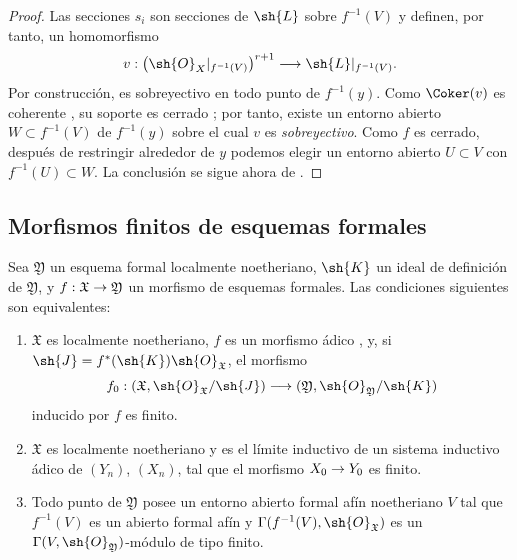 \documentclass[oneside]{amsart}
\makeatletter
\newcommand{\ega@arrow}[2]{\mathchoice{#1}{#2}{#2}{#2}}
\renewcommand{\to}{\ega@arrow{\longrightarrow}{\rightarrow}}
\let\EGAOriginalLabel\label
\renewcommand{\label}[1]{\phantomsection\EGAOriginalLabel{#1}}
\makeatother
\begin{document}
\begin{proof}
Las secciones $s_i$ son secciones de $\sh{L}$ sobre $f^{-1}(V)$ y
definen, por tanto, un homomorfismo
\[
  v:
  \bigl(\sh{O}_X|_{f^{-1}(V)}\bigr)^{r+1}
  \longrightarrow
  \sh{L}|_{f^{-1}(V)}.
\]
Por construcción, es sobreyectivo en todo punto de $f^{-1}(y)$.
Como $\Coker(v)$ es coherente , su soporte es
cerrado ; por tanto, existe un entorno abierto
$W\subset f^{-1}(V)$ de $f^{-1}(y)$ sobre el cual $v$ es \emph{sobreyectivo}.
Como $f$ es cerrado, después de restringir alrededor de $y$ podemos elegir un
entorno abierto $U\subset V$ con $f^{-1}(U)\subset W$.
La conclusión se sigue ahora de .
\end{proof}


\subsection{Morfismos finitos de esquemas formales}
\label{subsection:III.4.8}

\begin{proposition}[4.8.1]
\label{III.4.8.1}
Sea $\mathfrak{Y}$ un esquema formal localmente noetheriano,
$\sh{K}$ un ideal de definición de $\mathfrak{Y}$, y
$f:\mathfrak{X}\to\mathfrak{Y}$ un morfismo de esquemas formales.
Las condiciones siguientes son equivalentes:
\begin{enumerate}
  \item[\rm{a)}] $\mathfrak{X}$ es localmente noetheriano, $f$ es un
    morfismo ádico , y, si
    $\sh{J}=f^*(\sh{K})\sh{O}_{\mathfrak{X}}$, el morfismo
    \[
      f_0:
      (\mathfrak{X},\sh{O}_{\mathfrak{X}}/\sh{J})
      \longrightarrow
      (\mathfrak{Y},\sh{O}_{\mathfrak{Y}}/\sh{K})
    \]
    inducido por $f$ es finito.
  \item[\rm{b)}] $\mathfrak{X}$ es localmente noetheriano y es el
    límite inductivo de un sistema inductivo ádico de $(Y_n)$, $(X_n)$,
    tal que el morfismo $X_0\to Y_0$ es finito.
  \item[\rm{c)}] Todo punto de $\mathfrak{Y}$ posee un entorno abierto
    formal afín noetheriano $V$ tal que $f^{-1}(V)$ es
    un abierto formal afín y
    $\Gamma(f^{-1}(V),\sh{O}_{\mathfrak{X}})$ es un
    $\Gamma(V,\sh{O}_{\mathfrak{Y}})$-módulo de tipo finito.
\end{enumerate}
\end{proposition}
\end{document}
